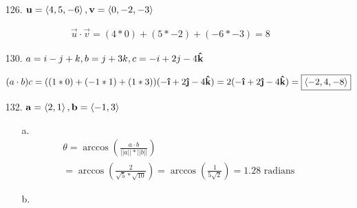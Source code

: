 \documentclass[10pt, letterpaper]{article}
\begin{document}
    \begin{itemize}
        \item [126.] $\mathbf{u} = \expval{4, 5, -6}, \mathbf{v} = \expval{0, -2, -3}$
        
        \begin{mdframed}
            \begin{equation*}
                \begin{gathered}
                    \vec{u} \cdot \vec{v} = (4 * 0) + (5 * -2) + (-6 * -3) = \boxed{8}
                \end{gathered}
            \end{equation*}
        \end{mdframed}

        \item [130.] $a = i - j + k, b = j + 3k, c = -i + 2j - 4\boldsymbol{\hat{\textbf{k}}}$
        
        \begin{mdframed}
            \begin{equation*}
                \begin{gathered}
                    (a \cdot b)c = ((1 * 0) + (-1 * 1) + (1 * 3))(-\ihat + 2\jhat - 4\khat) 
                    = 2(-\ihat + 2\jhat - 4\khat) = \boxed{\expval{-2, 4, -8}}
                \end{gathered}
            \end{equation*}
        \end{mdframed}

        \item [132.] $\mathbf{a} = \expval{2, 1}, \mathbf{b} = \expval{-1, 3}$
        
        \begin{mdframed}
            \begin{itemize}
                \item [a.]
                \begin{equation*}
                    \begin{gathered}
                            \theta = \arccos\left(\frac{a \cdot b}{||a||*||b||}\right)  \\
                                   = \arccos\left(\frac{2}{\sqrt{5} * \sqrt{10}}\right)
                                   = \arccos\left(\frac{1}{5\sqrt{2}}\right) = \boxed{1.28 \text{ radians}}
                    \end{gathered}
                \end{equation*}
                \item [b.] 
            \end{itemize}
        \end{mdframed}


\end{itemize}
\end{document}
